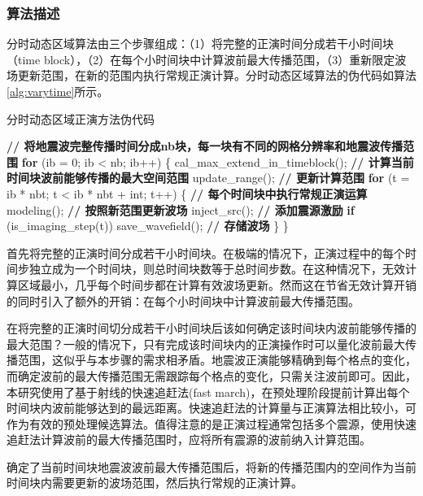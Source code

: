 \subsubsection{算法描述}

分时动态区域算法由三个步骤组成：（1）将完整的正演时间分成若干小时间块（time block），（2）在每个小时间块中计算波前最大传播范围，（3）重新限定波场更新范围，在新的范围内执行常规正演计算。分时动态区域算法的伪代码如算法\ref{alg:varytime}所示。


\begin{algorithm}[ht]
\small
\caption{分时动态区域正演方法伪代码} \label{alg:varytime}
\begin{algorithmic}[1]
\State \textbf{// 将地震波完整传播时间分成nb块，每一块有不同的网格分辨率和地震波传播范围}
\State \textbf{for} (ib = 0; ib < nb; ib++) \{
\State \quad\quad cal\_max\_extend\_in\_timeblock(); \textbf{// 计算当前时间块波前能够传播的最大空间范围}
\State \quad\quad update\_range(); \textbf{// 更新计算范围}
\State \quad\quad
\State \quad\quad \textbf{for} (t = ib * nbt; t < ib * nbt + int; t++) \{ \textbf{// 每个时间块中执行常规正演运算}
\State \quad\quad\quad\quad modeling(); \textbf{// 按照新范围更新波场}
\State \quad\quad\quad\quad inject\_src(); \textbf{// 添加震源激励}
\State \quad\quad\quad\quad \textbf{if} (is\_imaging\_step(t))
\State \quad\quad\quad\quad\quad\quad save\_wavefield(); \textbf{// 存储波场}
\State \quad\quad \}
\State \}
\end{algorithmic}
\end{algorithm}

首先将完整的正演时间分成若干小时间块。在极端的情况下，正演过程中的每个时间步独立成为一个时间块，则总时间块数等于总时间步数。在这种情况下，无效计算区域最小，几乎每个时间步都在计算有效波场更新。然而这在节省无效计算开销的同时引入了额外的开销：在每个小时间块中计算波前最大传播范围。

在将完整的正演时间切分成若干小时间块后该如何确定该时间块内波前能够传播的最大范围？一般的情况下，只有完成该时间块内的正演操作时可以量化波前最大传播范围，这似乎与本步骤的需求相矛盾。地震波正演能够精确到每个格点的变化，而确定波前的最大传播范围无需跟踪每个格点的变化，只需关注波前即可。因此，本研究使用了基于射线的快速追赶法(fast march)，在预处理阶段提前计算出每个时间块内波前能够达到的最远距离。快速追赶法的计算量与正演算法相比较小，可作为有效的预处理候选算法。值得注意的是正演过程通常包括多个震源，使用快速追赶法计算波前的最大传播范围时，应将所有震源的波前纳入计算范围。

确定了当前时间块地震波波前最大传播范围后，将新的传播范围内的空间作为当前时间块内需要更新的波场范围，然后执行常规的正演计算。


